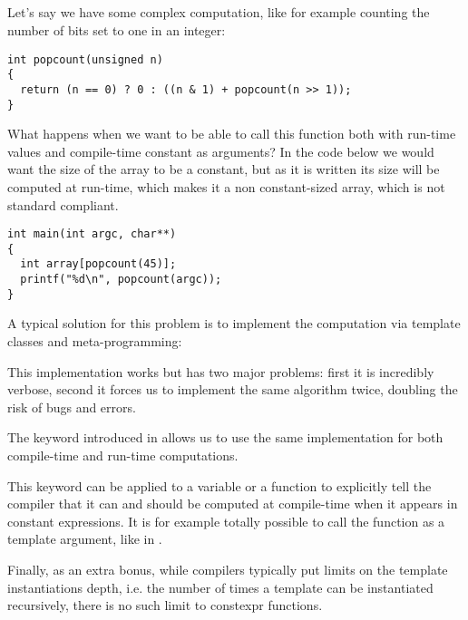 \subsection{}

Let's say we have some complex computation, like for example counting
the number of bits set to one in an integer:

\begin{lstlisting}
int popcount(unsigned n)
{
  return (n == 0) ? 0 : ((n & 1) + popcount(n >> 1));
}
\end{lstlisting}

What happens when we want to be able to call this function both with
run-time values and compile-time constant as arguments? In the code
below we would want the size of the array to be a constant, but as it
is written its size will be computed at run-time, which makes it a non
constant-sized array, which is not standard compliant.

\begin{lstlisting}
int main(int argc, char**)
{
  int array[popcount(45)];
  printf("%d\n", popcount(argc));
}
\end{lstlisting}

A typical solution for this problem is to implement the computation
via template classes and meta-programming:


This implementation works but has two major problems: first it is
incredibly verbose, second it forces us to implement the same
algorithm twice, doubling the risk of bugs and errors.

\bigskip

The  keyword introduced in  allows us to use the
same implementation for both compile-time and run-time computations.


This keyword can be applied to a variable or a function to explicitly
tell the compiler that it can and should be computed at compile-time
when it appears in constant expressions. It is for example totally
possible to call the  function as a
template argument, like in .

Finally, as an extra bonus, while compilers typically put limits on
the template instantiations depth, i.e. the number of times a template
can be instantiated recursively, there is no such limit to
constexpr functions.
